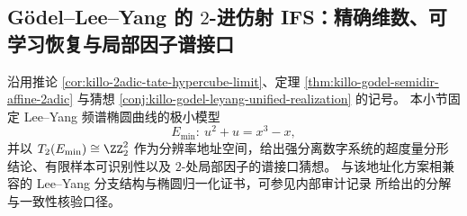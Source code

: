 \subsection{Gödel--Lee--Yang 的 \(2\)-进仿射 IFS：精确维数、可学习恢复与局部因子谱接口}\label{subsec:conclusion-godel-leyang-2adic-ifs-dimension-learning-local-factor}
沿用推论 \ref{cor:killo-2adic-tate-hypercube-limit}、定理 \ref{thm:killo-godel-semidir-affine-2adic} 与猜想 \ref{conj:killo-godel-leyang-unified-realization} 的记号。
本小节固定 Lee--Yang 频谱椭圆曲线的极小模型
\[
E_{\min}:\ u^2+u=x^3-x,
\]
并以 \(T_2(E_{\min})\cong\ZZ_2^2\) 作为分辨率地址空间，给出强分离数字系统的超度量分形结论、有限样本可识别性以及 \(2\)-处局部因子的谱接口猜想。
与该地址化方案相兼容的 Lee--Yang 分支结构与椭圆归一化证书，可参见内部审计记录 \cite{Internal2026TerminalZmLeeYangEllipticS4Audit} 所给出的分解与一致性核验口径。




